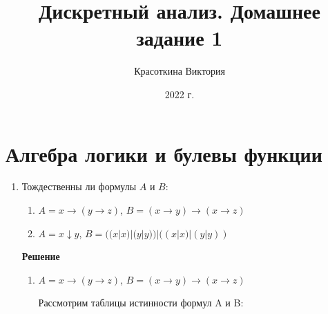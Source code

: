 \documentclass[12pt]{article}
\author{Красоткина Виктория}
\title{Дискретный анализ. Домашнее задание 1}
\date{2022 г.}
\begin{document}
		
		\maketitle
		\tableofcontents
		\thispagestyle{empty}
		\newpage
		
	\section{Алгебра логики и булевы функции}
	\begin{enumerate}[label={\textbf{\arabic{section}.\arabic*}}]
		\item Тождественны ли формулы $A$ и $B$:
		\begin{enumerate}[label=\textbf{\alph*)}]
			\item $A = x\rightarrow (y\rightarrow z)$, $B = (x\rightarrow y)\rightarrow(x\rightarrow z)$
			\item $A = x\downarrow y$, $B = ((x|x)|(y|y))|((x|x)|(y|y))$
		\end{enumerate}
		\textbf{Решение}
		\begin{enumerate}[label=\textbf{\alph*)}]
			\item $A = x \rightarrow (y \rightarrow z)$, $B = (x \rightarrow y) \rightarrow (x \rightarrow z)$
			
			Рассмотрим таблицы истинности формул A и B:
			

\end{enumerate}
\end{enumerate}
\end{document}
